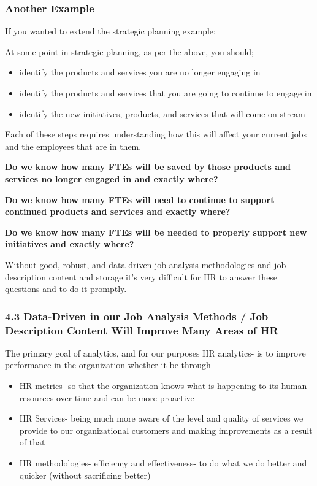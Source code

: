 \documentclass[12pt,letterpaper]{article}
\begin{document}
{{{\subsubsection{Another Example}\label{another-example}

If you wanted to extend the strategic planning example:

At some point in strategic planning, as per the above, you should;

\begin{itemize}
\item
  identify the products and services you are no longer engaging in
\item
  identify the products and services that you are going to continue to
  engage in
\item
  identify the new initiatives, products, and services that will come on
  stream
\end{itemize}

Each of these steps requires understanding how this will affect your
current jobs and the employees that are in them.

\textbf{Do we know how many FTEs will be saved by those products and
services no longer engaged in and exactly where?}

\textbf{Do we know how many FTEs will need to continue to support
continued products and services and exactly where?}

\textbf{Do we know how many FTEs will be needed to properly support new
initiatives and exactly where?}

Without good, robust, and data-driven job analysis methodologies and job
description content and storage it's very difficult for HR to answer
these questions and to do it promptly.

\subsubsection{4.3 Data-Driven in our Job Analysis Methods / Job
Description Content Will Improve Many Areas of
HR}

The primary goal of analytics, and for our purposes HR analytics- is to
improve performance in the organization whether it be through

\begin{itemize}
\item
  HR metrics- so that the organization knows what is happening to its
  human resources over time and can be more proactive
\item
  HR Services- being much more aware of the level and quality of
  services we provide to our organizational customers and making
  improvements as a result of that
\item
  HR methodologies- efficiency and effectiveness- to do what we do
  better and quicker (without sacrificing better)
\end{itemize}


}}}
\end{document}
